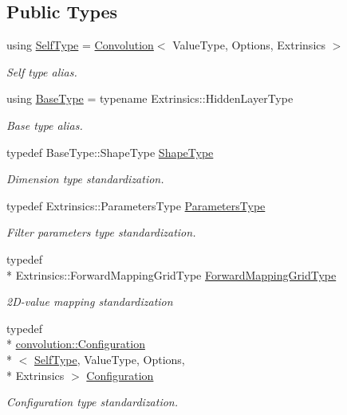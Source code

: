\subsection*{Public Types}
\begin{DoxyCompactItemize}
\item 
using \hyperlink{classffnn_1_1layer_1_1_convolution_ac3985357df433360d75f39353faae600}{Self\-Type} = \hyperlink{classffnn_1_1layer_1_1_convolution}{Convolution}$<$ Value\-Type, Options, Extrinsics $>$
\begin{DoxyCompactList}\small\item\em Self type alias. \end{DoxyCompactList}\item 
using \hyperlink{classffnn_1_1layer_1_1_convolution_a30a3026202f29a601e539c80824fcf1f}{Base\-Type} = typename Extrinsics\-::\-Hidden\-Layer\-Type
\begin{DoxyCompactList}\small\item\em Base type alias. \end{DoxyCompactList}\item 
typedef Base\-Type\-::\-Shape\-Type \hyperlink{classffnn_1_1layer_1_1_convolution_ab76070ee3cc7b42325f46bc3bc86bf5f}{Shape\-Type}
\begin{DoxyCompactList}\small\item\em Dimension type standardization. \end{DoxyCompactList}\item 
typedef Extrinsics\-::\-Parameters\-Type \hyperlink{classffnn_1_1layer_1_1_convolution_af2568040fc4089f93a6483da08dcc266}{Parameters\-Type}
\begin{DoxyCompactList}\small\item\em Filter parameters type standardization. \end{DoxyCompactList}\item 
typedef \\*
Extrinsics\-::\-Forward\-Mapping\-Grid\-Type \hyperlink{classffnn_1_1layer_1_1_convolution_a2b15b4e46b7679753e4f3e28b619bae5}{Forward\-Mapping\-Grid\-Type}
\begin{DoxyCompactList}\small\item\em 2\-D-\/value mapping standardization \end{DoxyCompactList}\item 
typedef \\*
\hyperlink{classffnn_1_1layer_1_1convolution_1_1_configuration}{convolution\-::\-Configuration}\\*
$<$ \hyperlink{classffnn_1_1layer_1_1_convolution_ac3985357df433360d75f39353faae600}{Self\-Type}, Value\-Type, Options, \\*
Extrinsics $>$ \hyperlink{classffnn_1_1layer_1_1_convolution_a01dee52138bb0d51a1ecddb5504176be}{Configuration}
\begin{DoxyCompactList}\small\item\em Configuration type standardization. \end{DoxyCompactList}\end{DoxyCompactItemize}
